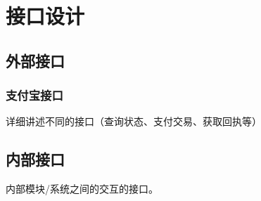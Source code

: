 \chapter{接口设计}
\section{外部接口}


\subsection{支付宝接口}
详细讲述不同的接口（查询状态、支付交易、获取回执等）

\section{内部接口}
内部模块/系统之间的交互的接口。
